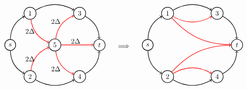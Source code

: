     \[\begin{tabular}{ccc}
        \begin{tikzpicture}[node distance={18mm}, thick , main/.style = {draw, circle}] 
        
        \node[main] (0) {$s$};
        \node[main] (1) at (1, 1.6) {1};
        \node[main] (2) at (1, -1.6) {2};
        \node[main] (3) at (3.5, 1.6) {3};
        \node[main] (4) at (3.5, -1.6) {4};
        \node[main] (6) at (2.25,0) {5};
        \node[main] (5) at (4.5, 0) {$t$};

        \draw[->] (0)[bend left] to (1);
        \draw[->] (0)[bend right] to (2);
        \draw[->] (1)[bend left] to (3);
        \draw[->] (2)[bend right] to (4);
        \draw[->] (4)[bend right] to (5);
        \draw[->] (3)[bend left] to (5);

        \draw[->] (1)[red, bend right] to (6);
        \draw[->] (6)[red, bend right] to (4);
        \draw[->] (6)[red, bend left] to (3);
        \draw[->] (2)[red, bend left] to (6);
        \draw[->] (6) [red] to (5);

        \node at (3.3,0.2) {$2\Delta$};
        \node at (2.3,1.2) {$2\Delta$};
        \node at (2.3,-1.2) {$2\Delta$};

        \node at (1,.7) {$2\Delta$};
        \node at (1,-.7) {$2\Delta$};
        

    \end{tikzpicture}&\begin{tikzpicture}
        \node {$\implies$};%
        \node at (0,1.4) {};
        \node at (0,-1.95) {};
    \end{tikzpicture}  &
    \begin{tikzpicture}[node distance={19mm}, thick , main/.style = {draw, circle}] 
        \node[main] (0) {$s$};
        \node[main] (1) at (1, 1.6) {1};
        \node[main] (2) at (1, -1.6) {2};
        \node[main] (3) at (3.5, 1.6) {3};
        \node[main] (4) at (3.5, -1.6) {4};
        \node[main] (5) at (4.5, 0) {$t$};

        \draw[->] (0)[bend left] to (1);
        \draw[->] (0)[bend right] to (2);
        \draw[->] (1)[bend left] to (3);
        \draw[->] (2)[bend right] to (4);
        \draw[->] (4)[bend right] to (5);
        \draw[->] (3)[bend left] to (5);

        \draw[->] (1)[red, bend right] to (3);
        \draw[->] (2)[red, bend left] to (4);
        \draw[->] (2)[red, bend left = 23] to (5);
        \draw[->] (1)[red, bend right = 23] to (5);


    \end{tikzpicture}
    \end{tabular}\]

